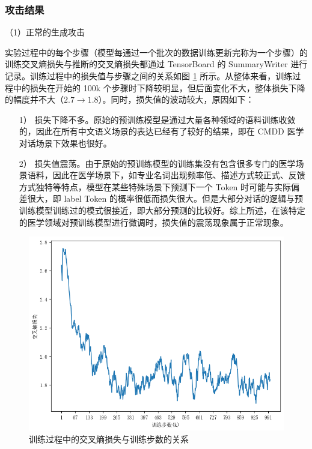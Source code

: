 \subsubsection{攻击结果}

（1）正常的生成攻击


实验过程中的每个步骤（模型每通过一个批次的数据训练更新完称为一个步骤）的训练交叉熵损失与推断的交叉熵损失都通过 TensorBoard 的 SummaryWriter\cite{tensorflow} 进行记录。训练过程中的损失值与步骤之间的关系如图 \ref{Chap3_train_loss} 所示。从整体来看，训练过程中的损失在开始的 100k 个步骤时下降较明显，但后面变化不大，整体损失下降的幅度并不大（$2.7\rightarrow 1.8$）。同时，损失值的波动较大，原因如下：

\begin{itemize}
	\item [1）]
	损失下降不多。原始的预训练模型是通过大量各种领域的语料训练收敛的，因此在所有中文语义场景的表达已经有了较好的结果，即在 CMDD 医学对话场景下效果也很好。
	\item [2）]
	损失值震荡。由于原始的预训练模型的训练集没有包含很多专门的医学场景语料，因此在医学场景下，如专业名词出现频率低、描述方式较正式、反馈方式独特等特点，模型在某些特殊场景下预测下一个 Token 时可能与实际偏差很大，即 label Token 的概率很低而损失很大。但是大部分对话的逻辑与预训练模型训练过的模式很接近，即大部分预测的比较好。综上所述，在该特定的医学领域对预训练模型进行微调时，损失值的震荡现象属于正常现象。
\end{itemize}

\begin{figure}[h]
	\centering
	\includegraphics[width=\linewidth]{figures/Chap3_train_loss.png}
	\caption{训练过程中的交叉熵损失与训练步数的关系}
	\label{Chap3_train_loss}
\end{figure}



